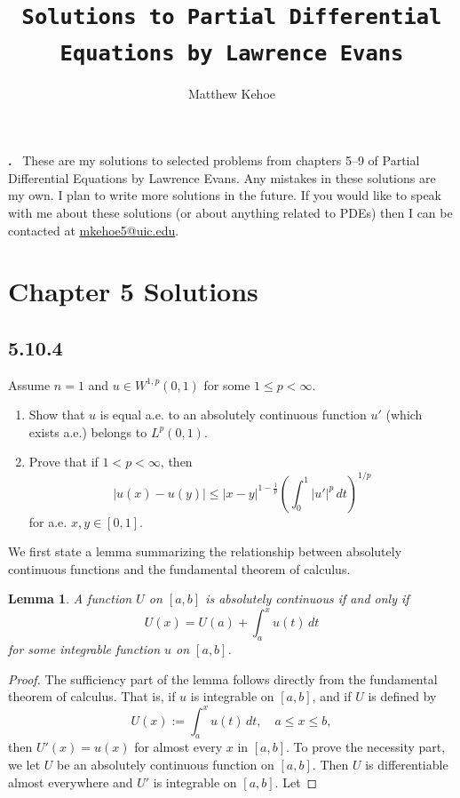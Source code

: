 \documentclass{article}
\title{\texttt{Solutions to Partial Differential Equations by Lawrence Evans}}
\author{Matthew Kehoe}
\newtheorem{lemma}[theorem]{Lemma}
\renewenvironment{abstract}
 {\par\noindent\textbf{\abstractname.}\ \ignorespaces}
 {\par\medskip}
\begin{document}
\maketitle
\begin{flushleft}
\begin{abstract}
These are my solutions to selected problems from chapters 5--9 of Partial Differential Equations by Lawrence Evans. Any mistakes in these solutions are my own. I plan to write more solutions in the future. If you would like to speak with me about these solutions (or about anything related to PDEs) then I can be contacted at \href{mailto:mkehoe5@uic.edu}{mkehoe5@uic.edu}.
\end{abstract}
\tableofcontents

\maketitle
{}
\section{Chapter 5 Solutions}
\subsection{\textbf{5.10.4}} Assume $n=1$ and $u\in W^{1,p}(0,1)$ for some $1 \le p < \infty$. \begin{enumerate}[label=(\alph*)]
    \item Show that $u$ is equal a.e. to an absolutely continuous function $u'$ (which exists a.e.) belongs to $L^p(0,1)$.
    \item Prove that if $1<p<\infty$, then
    $$|u(x)-u(y)| \le |x-y|^{1-\frac{1}{p}}\left(\int_0^1 |u'|^p\,dt\right)^{1/p}$$
    for a.e. $x,y\in[0,1]$.
\end{enumerate}

We first state a lemma summarizing the relationship between absolutely continuous functions and the fundamental theorem of calculus.
\begin{lemma}A function $U$ on $[a,b]$ is absolutely continuous if and only if 
$$U(x) = U(a)+\int_a^x u(t)\,dt$$
for some integrable function $u$ on $[a,b]$.
\end{lemma}
\begin{proof}
The sufficiency part of the lemma follows directly from the fundamental theorem of calculus. That is, if $u$ is integrable on $[a,b]$, and if $U$ is defined by 
$$U(x):=\int_a^x u(t)\,dt,\quad a\le x \le b,$$
then $U'(x)=u(x)$ for almost every $x$ in $[a,b]$. To prove the necessity part, we let $U$ be an absolutely continuous function on $[a, b]$. Then $U$ is differentiable almost everywhere and $U'$ is integrable on $[a, b]$. Let


\end{proof}
\end{flushleft}
\end{document}
